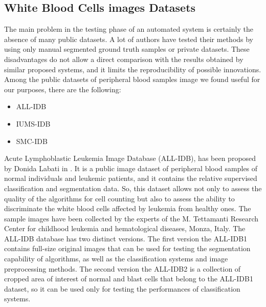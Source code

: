 \documentclass[final,a4paper,12pt,english]{UnicaPhdThesis3}
\begin{document}
\subsection{White Blood Cells images Datasets}
\label{wbc_datasets}
The main problem in the testing phase ​of an automated system is certainly the absence of many public datasets. A lot of authors have tested their methods by using only manual segmented ground truth samples or private datasets. These disadvantages do not allow a direct comparison with the results obtained by similar proposed systems, and it limits the reproducibility of possible innovations. Among the public datasets of peripheral blood samples image we found useful for our purposes, there are the following:
\begin{itemize}
	\item ALL-IDB \cite{Donida}
	\item IUMS-IDB \cite{Sarrafzadeh}
	\item SMC-IDB \cite{Mohamed}
\end{itemize} 
Acute Lymphoblastic Leukemia Image Database (\acs{ALL-IDB}), has been proposed by Donida Labati in \cite{Donida}. It is a public image dataset of peripheral blood samples of normal individuals and leukemic patients, and it contains the relative supervised classification and segmentation data. So, this dataset allows not only to assess the quality of the algorithms for cell counting but also to assess the ability to discriminate the white blood cells affected by leukemia from healthy ones. The sample images have been collected by the experts of the M. Tettamanti Research Center for childhood leukemia and hematological diseases, Monza, Italy. The ALL-IDB database has two distinct versions. The first version the ALL-IDB1 contains full-size original images that can be used for testing the segmentation capability of algorithms, as well as the classification systems and image preprocessing methods. The second version the ALL-IDB2 is a collection of cropped area of interest of normal and blast cells that belong to the ALL-IDB1 dataset, so it can be used only for testing the performances of classification systems.
\end{document}

